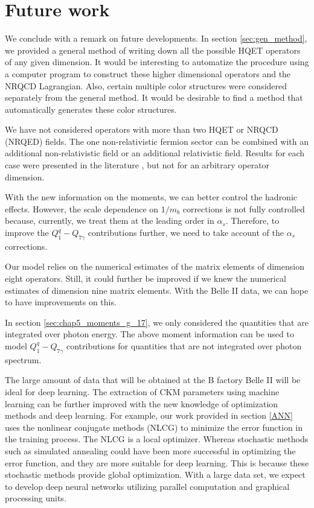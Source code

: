 \section{Future work}
We conclude with a remark on future developments. In section \ref{sec:gen_method}, we provided a general method of writing down all the possible HQET operators of any given dimension. It would be interesting to automatize the procedure using a computer program to construct these higher dimensional operators and the NRQCD Lagrangian. Also, certain multiple color structures were considered separately from the general method. It would be desirable to find a method that automatically generates these color structures.\par
We have not considered operators with more than two HQET or NRQCD (NRQED) fields. The one non-relativistic fermion sector can be combined with an additional non-relativistic field or an additional relativistic field.  Results for each case were presented in the literature  \cite{Bodwin:1994jh, Brambilla:2006ph, Brambilla:2008zg, Hill:2012rh, Dye:2016uep}, but not for an arbitrary operator dimension.\par
With the new information on the moments, we can better control the hadronic effects. However, the scale dependence on $1/m_b$ corrections is not fully controlled because, currently, we treat them at the leading order in $\alpha_s$. Therefore, to improve the $Q_{1}^q-Q_{7\gamma}$ contributions further, we need to take account of the $\alpha_s$ corrections.\par
Our model relies on the numerical estimates of the matrix elements of dimension eight operators. Still, it could further be improved if we knew the numerical estimates of dimension nine matrix elements. With the Belle II data, we can hope to have improvements on this.\par
In section \ref{sec:chap5_moments_g_17}, we only considered the quantities that are integrated over photon energy. The above moment information can be used to model $Q_{1}^q-Q_{7\gamma}$ contributions for quantities that are not integrated over photon spectrum.\par
The large amount of data that will be obtained at the B factory
Belle II will be ideal for deep learning. The extraction of CKM parameters using machine learning can be further improved with the new knowledge of optimization methods and deep learning. For example, our work provided in section \ref{ANN} uses the nonlinear conjugate methods (NLCG) to minimize the error function in the training process. The NLCG is a local optimizer. Whereas stochastic methods such as simulated annealing could have been more successful in optimizing the error function, and they are more suitable for deep learning. This is because these stochastic methods provide global optimization. With a large data set, we expect to develop deep neural networks utilizing parallel computation and graphical processing units.


%